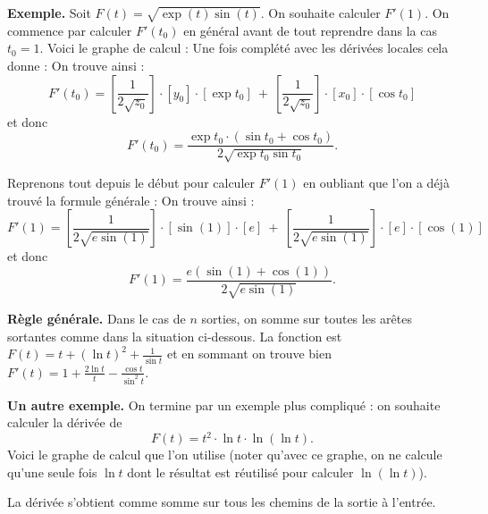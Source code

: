 \bigskip
\textbf{Exemple.}
Soit $F(t) = \sqrt{\exp(t)\sin(t)}$. On souhaite calculer $F'(1)$. On commence par calculer $F'(t_0)$ en général avant de tout reprendre dans la cas $t_0=1$.
Voici le graphe de calcul :
Une fois complété avec les dérivées locales cela donne :
On trouve ainsi :
$$F'(t_0) = \left[\frac{1}{2\sqrt{z_0}}\right]\cdot[y_0]\cdot[\exp t_0]
\  + \  \left[\frac{1}{2\sqrt{z_0}}\right]\cdot[x_0]\cdot[\cos t_0]
$$
et donc 
$$F'(t_0) = \frac{\exp t_0 \cdot (\sin t_0 + \cos t_0)}{2\sqrt{\exp t_0 \sin t_0}}.$$

Reprenons tout depuis le début pour calculer $F'(1)$ en oubliant que l'on a déjà trouvé la formule générale :
On trouve ainsi :
$$F'(1) = \left[\frac{1}{2\sqrt{e\sin(1)}}\right]\cdot[\sin(1)]\cdot[e]
\  + \  \left[\frac{1}{2\sqrt{e\sin(1)}}\right]\cdot[e]\cdot[\cos(1)]
$$
et donc 
$$F'(1) = \frac{e (\sin(1)+\cos(1))}{2\sqrt{e\sin(1)}}.$$


\bigskip
\textbf{Règle générale.}
Dans le cas de $n$ sorties, on somme sur toutes les arêtes sortantes comme dans la situation ci-dessous.
La fonction est $F(t) = t + (\ln t)^2 + \frac{1}{\sin t}$ et en sommant on trouve bien $F'(t) = 1 + \frac{2\ln t}{t} - \frac{\cos t}{\sin^2 t}$.


\bigskip
\textbf{Un autre exemple.}
On termine par un exemple plus compliqué : on souhaite calculer la dérivée de 
$$F(t) = t^2 \cdot \ln t \cdot \ln(\ln t).$$
Voici le graphe de calcul que l'on utilise (noter qu'avec ce graphe, on ne calcule qu'une seule fois $\ln t$ dont le résultat est réutilisé pour calculer $\ln(\ln t)$).


La dérivée s'obtient comme somme sur tous les chemins de la sortie à l'entrée.
